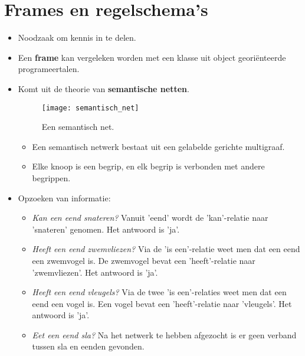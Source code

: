\section{Frames en regelschema's}
\begin{itemize}
	\item Noodzaak om kennis in te delen.
	\item Een \textbf{frame} kan vergeleken worden met een klasse uit object georiënteerde programeertalen.
	\item Komt uit de theorie van \textbf{semantische netten}.
	\begin{figure}
		\texttt{[image: semantisch\_net]}
		\caption{Een semantisch net.}
	\end{figure}
	\begin{itemize}
		\item Een semantisch netwerk bestaat uit een gelabelde gerichte multigraaf.
		\item Elke knoop is een begrip, en elk begrip is verbonden met andere begrippen.
	\end{itemize}
	\item Opzoeken van informatie:
	\begin{itemize}
		\item \textit{Kan een eend snateren?} Vanuit 'eend' wordt de 'kan'-relatie naar 'snateren' genomen. Het antwoord is 'ja'.
		\item \textit{Heeft een eend zwemvliezen?} Via de 'is een'-relatie weet men dat een eend een zwemvogel is. De zwemvogel bevat een 'heeft'-relatie naar 'zwemvliezen'. Het antwoord is 'ja'.
		\item \textit{Heeft een eend vleugels?} Via de twee 'is een'-relaties weet men dat een eend een vogel is. Een vogel bevat een 'heeft'-relatie naar 'vleugels'. Het antwoord is 'ja'.
		\item \textit{Eet een eend sla?} Na het netwerk te hebben afgezocht is er geen verband tussen sla en eenden gevonden.
		

\end{itemize}
\end{itemize}
